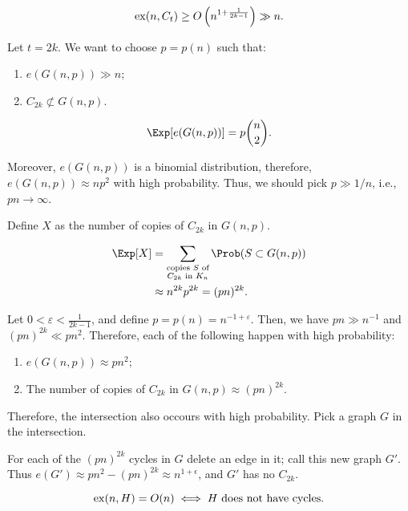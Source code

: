 \begin{thm}
	\[
		\operatorname{ex}(n, C_t) \ge O\left(n^{1+\frac{1}{2k-1}}\right) \gg n.
	\]
\end{thm}

\begin{dem}
	Let $t = 2k$. We want to choose $p = p(n)$ such that:
	\begin{enumerate}[label = \textbullet]
		\item $e(G(n, p)) \gg n$;
		\item $C_{2k} \not\subset G(n, p)$.
	\end{enumerate}

	\[
		\Exp[e(G(n, p))] = p\binom{n}{2}.
	\]

	Moreover, $e(G(n, p))$ is a binomial distribution, therefore, $e(G(n, p)) \approx np^2$ with high probability. Thus, we should pick $p \gg 1/n$, i.e., $pn \to \infty$. 

	Define $X$ as the number of copies of $C_{2k}$ in $G(n, p)$.

	\begin{align*}
		\Exp[X] &= \sum_{\substack{\text{copies $S$ of}\\C_{2k}\text{ in }K_n}} \Prob(S \subset G(n, p))\\
				&\approx n^{2k} p^{2k} = (pn)^{2k}.
	\end{align*}

	Let $0 < \varepsilon < \frac{1}{2k-1}$, and define $p = p(n) = n^{-1+\varepsilon}$. Then, we have $pn \gg n^{-1}$ and $(pn)^{2k} \ll pn^2$. Therefore, each of the following happen with high probability:
	\begin{enumerate}[label = \textbullet]
		\item $e(G(n, p)) \approx pn^2$;
		\item The number of copies of $C_{2k}$ in $G(n, p) \approx (pn)^{2k}$.
	\end{enumerate}

	Therefore, the intersection also occours with high probability. Pick a graph $G$ in the intersection.

	For each of the $(pn)^{2k}$ cycles in $G$ delete an edge in it; call this new graph $G'$. Thus $e(G') \approx pn^2 - (pn)^{2k} \approx n^{1+\epsilon} $, and $G'$ has no $C_{2k}$.
\end{dem}

\begin{thm}
	\[
		\operatorname{ex}(n, H) = O(n) \iff H\ \text{does not have cycles}.
	\]
\end{thm}

